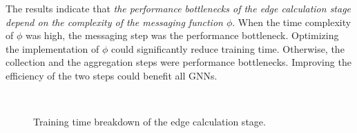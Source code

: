 The results indicate that \emph{the performance bottlenecks of the edge calculation stage depend on the complexity of the messaging function $\phi$}.
%
When the time complexity of $\phi$ was high, the messaging step was the performance bottleneck.
%
Optimizing the implementation of $\phi$ could significantly reduce training time.
%
Otherwise, the collection and the aggregation steps were performance bottlenecks.
%
Improving the efficiency of the two steps could benefit all GNNs.

\begin{figure}[H]
    \centering
    \\
    \caption{Training time breakdown of the edge calculation stage.}
    \label{fig:exp_edge_calc_decomposition}
\end{figure}

